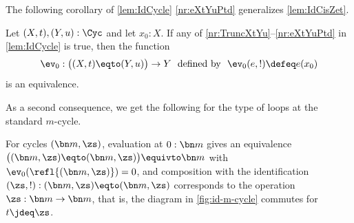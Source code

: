 The following corollary of \cref{lem:IdCycle} \ref{nr:eXtYuPtd}
generalizes \cref{lem:IdCisZet}.

\begin{corollary}\label{cor:ConnCycles}
  Let $(X,t),(Y,u):\Cyc$ and let $x_0:X$.
  If any of \ref{nr:TruncXtYu}--\ref{nr:eXtYuPtd} in \cref{lem:IdCycle} is
  true, then the function
  \[
    \ev_0:\bigl((X,t)\eqto(Y,u)\bigr)\to Y
    \text{~~defined by~~} \ev_0(e,!) \defeq e(x_0)
  \]
  is an equivalence.
\end{corollary}

As a second consequence,
we get the following for the type of loops at the standard $m$-cycle.

\begin{marginfigure}
\caption{\label{fig:id-m-cycle}
For the diagram to be well typed we require the precondition $P(t)$ saying that 
$(\bn m,t)$ is a cycle and $t$ commutes with $\protect\zs$.}
\end{marginfigure}

\begin{corollary}\label{cor:id-m-cycle}
  For cycles $(\bn m,\zs)$,
  evaluation at $0:\bn m$ gives an equivalence
  $\bigl((\bn m,\zs)\eqto(\bn m,\zs)\bigr) \equivto \bn m$
  with $\ev_0(\refl{(\bn m,\zs)}) = 0$, and
  composition with the identification
  $(\zs,!): (\bn m,\zs)\eqto(\bn m,\zs)$
  corresponds to the operation $\zs:\bn m\to\bn m$,
  that is, the diagram in \cref{fig:id-m-cycle} commutes for $t\jdeq\zs$.
\end{corollary}

